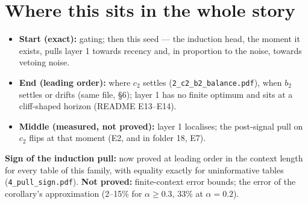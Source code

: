 \documentclass[11pt]{article}
\theoremstyle{remark}\newtheorem{remark}{Remark}
\newcommand{\1}{\mathbf{1}}
\begin{document}
\section{Where this sits in the whole story}
\begin{itemize}
\item \textbf{Start (exact):} gating; then this seed --- the induction head, the moment it exists,
pulls layer 1 towards recency and, in proportion to the noise, towards vetoing noise.
\item \textbf{End (leading order):} where $c_2$ settles (\texttt{2\_c2\_b2\_balance.pdf}), when $b_2$
settles or drifts (same file, \S6); layer 1 has no finite optimum and sits at a cliff-shaped
horizon (README E13--E14).
\item \textbf{Middle (measured, not proved):} layer 1 localises; the post-signal pull on $c_2$ flips
at that moment (E2, and in folder 18, E7).
\end{itemize}
\textbf{Sign of the induction pull:} now proved at leading order in the context length for every
table of this family, with equality exactly for uninformative tables (\texttt{4\_pull\_sign.pdf}).
\textbf{Not proved:} finite-context error bounds; the error of the corollary's
approximation (2--15\% for $\alpha\ge0.3$, 33\% at $\alpha=0.2$).
\end{document}
